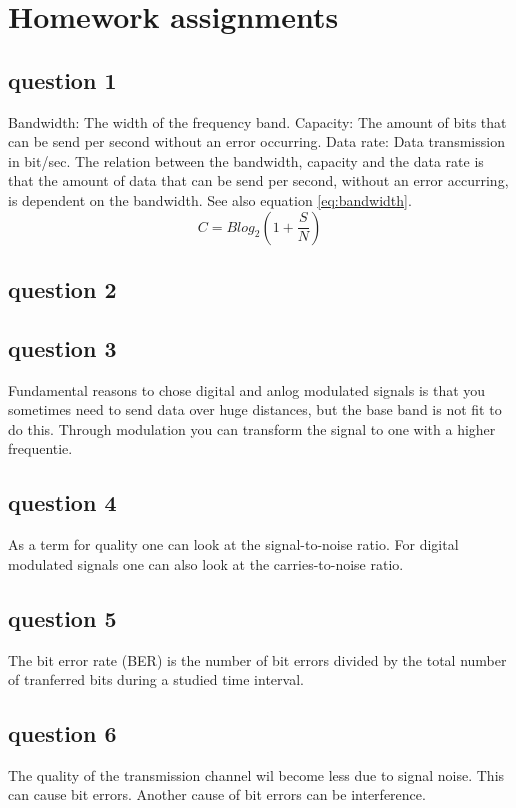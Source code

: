 \documentclass[final]{scrreprt} %
\begin{document}
\chapter{Homework assignments}
\label{homework}
\section{question 1}
Bandwidth: The width of the frequency band.
Capacity: The amount of bits that can be send per second without an error occurring. 
Data rate: Data transmission in bit/sec.
The relation between the bandwidth, capacity and the data rate is that the amount of data that can be send per second, without an error accurring, is dependent on the bandwidth. See also equation \ref{eq:bandwidth}.
\begin{equation}
\label{eq:bandwidth}
C= B log_{2}(1+\frac{S}{N})
\end{equation}
\section{question 2}

\section{question 3}
Fundamental reasons to chose digital and anlog modulated signals is that you sometimes need to send data over huge distances, but the base band is not fit to do this. Through modulation you can transform the signal to one with a higher frequentie.
\section{question 4}
As a term for quality one can look at the signal-to-noise ratio.
For digital modulated signals one can also look at the carries-to-noise ratio.
\section{question 5}
The bit error rate (BER) is the number of bit errors divided by the total number of tranferred bits during a studied time interval.
\section{question 6}
The quality of the transmission channel wil become less due to signal noise. This can cause bit errors. 
Another cause of bit errors can be interference.
\end{document}
